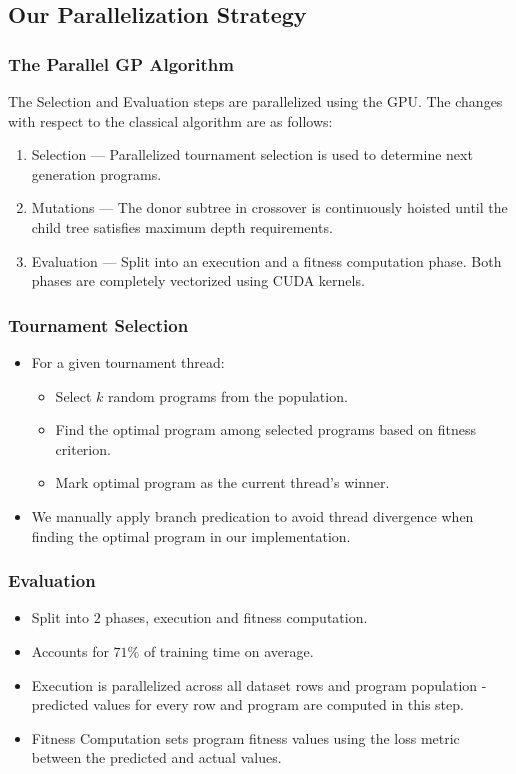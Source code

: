 \documentclass{beamer}
\begin{document}

\subsection{Our Parallelization Strategy}
\begin{frame}
  \frametitle{The Parallel GP Algorithm}
  The Selection and Evaluation steps are parallelized using the GPU. The changes with respect to the classical algorithm are as follows:
  \begin{enumerate}
    \item Selection --- Parallelized tournament selection is used to determine next generation programs.
    \item Mutations --- The donor subtree in crossover is continuously hoisted until the child tree satisfies maximum depth requirements.
    \item Evaluation --- Split into an execution and a fitness computation phase. Both phases are completely vectorized using CUDA kernels.
  \end{enumerate}
\end{frame}

\begin{frame}
  \frametitle{Tournament Selection}
  \begin{itemize}
    \item For a given tournament thread:
      \begin{itemize}
        \item Select $k$ random programs from the population.
        \item Find the optimal program among selected programs based on fitness criterion.
        \item Mark optimal program as the current thread's winner.
      \end{itemize}
    \item We manually apply branch predication to avoid thread divergence when finding the optimal program in our implementation.
  \end{itemize}
\end{frame}

\begin{frame}
  \frametitle{Evaluation}
  \begin{itemize}
    \item Split into $2$ phases, execution and fitness computation. 
    \item Accounts for $71 \%$ of training time on average.
    \item Execution is parallelized across all dataset rows and program population - predicted values for every row and program are computed in this step.
    \item Fitness Computation sets program fitness values using the loss metric between the predicted and actual values. 
  \end{itemize}
\end{frame}
\end{document}
